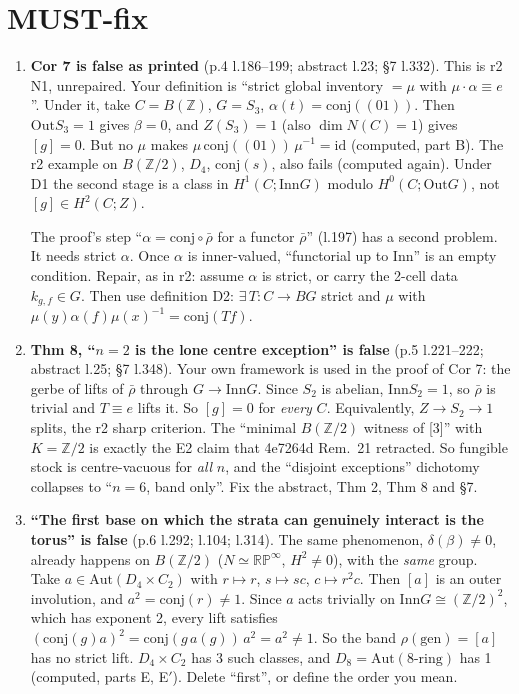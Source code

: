 \documentclass[11pt]{article}
\newcommand{\Z}{\mathbb{Z}}
\newcommand{\Inn}{\mathrm{Inn}}
\newcommand{\Out}{\mathrm{Out}}
\newcommand{\Aut}{\mathrm{Aut}}
\newcommand{\conj}{\mathrm{conj}}
\newcommand{\vd}[1]{\fbox{\textbf{#1}}}
\begin{document}
\section{MUST-fix}
\begin{enumerate}[label=\textbf{M\arabic*},leftmargin=*]
\item \vd{MUST} \textbf{Cor 7 is false as printed} (p.4 l.186--199; abstract l.23; §7 l.332). This
is r2 N1, unrepaired. Your definition is ``strict global inventory $=\mu$ with
$\mu\cdot\alpha\equiv e$''. Under it, take $C=B(\Z)$, $G=S_3$, $\alpha(t)=\conj((01))$. Then
$\Out S_3=1$ gives $\beta=0$, and $Z(S_3)=1$ (also $\dim N(C)=1$) gives $[g]=0$. But no $\mu$
makes $\mu\,\conj((01))\,\mu^{-1}=\mathrm{id}$ (computed, part B). The r2 example on $B(\Z/2)$,
$D_4$, $\conj(s)$, also fails (computed again). Under D1 the second stage is a class in
$H^1(C;\Inn G)$ modulo $H^0(C;\Out G)$, not $[g]\in H^2(C;Z)$.

The proof's step ``$\alpha=\conj\circ\bar\rho$ for a functor $\bar\rho$'' (l.197) has a second
problem. It needs strict $\alpha$. Once $\alpha$ is inner-valued, ``functorial up to Inn'' is an
empty condition. Repair, as in r2: assume $\alpha$ is strict, or carry the 2-cell data $k_{g,f}\in G$.
Then use definition D2: $\exists\,T:C\to BG$ strict and $\mu$ with
$\mu(y)\alpha(f)\mu(x)^{-1}=\conj(Tf)$.

\item \vd{MUST} \textbf{Thm 8, ``$n=2$ is the lone centre exception'' is false} (p.5 l.221--222;
abstract l.25; §7 l.348). Your own framework is used in the proof of Cor 7: the gerbe of lifts of
$\bar\rho$ through $G\to\Inn G$. Since $S_2$ is abelian, $\Inn S_2=1$, so $\bar\rho$ is trivial and
$T\equiv e$ lifts it. So $[g]=0$ for \emph{every} $C$. Equivalently, $Z\to S_2\to1$ splits, the
r2 sharp criterion. The ``minimal $B(\Z/2)$ witness of [3]'' with $K=\Z/2$ is exactly the E2 claim
that 4e7264d Rem.~21 retracted. So fungible stock is centre-vacuous for \emph{all} $n$, and the
``disjoint exceptions'' dichotomy collapses to ``$n=6$, band only''. Fix the abstract, Thm 2,
Thm 8 and §7.

\item \vd{MUST} \textbf{``The first base on which the strata can genuinely interact is the torus''
is false} (p.6 l.292; l.104; l.314). The same phenomenon, $\delta(\beta)\neq0$, already happens on
$B(\Z/2)$ ($N\simeq\mathbb{RP}^\infty$, $H^2\neq0$), with the \emph{same} group. Take
$a\in\Aut(D_4\times C_2)$ with $r\mapsto r$, $s\mapsto sc$, $c\mapsto r^2c$. Then $[a]$ is an
outer involution, and $a^2=\conj(r)\neq1$. Since $a$ acts trivially on $\Inn G\cong(\Z/2)^2$, which
has exponent 2, every lift satisfies $(\conj(g)a)^2=\conj(g\,a(g))\,a^2=a^2\neq1$. So the band
$\rho(\text{gen})=[a]$ has no strict lift. $D_4\times C_2$ has 3 such classes, and
$D_8=\Aut(8\text{-ring})$ has 1 (computed, parts E, E$'$). Delete ``first'', or define the order
you mean.
\end{enumerate}
\end{document}
